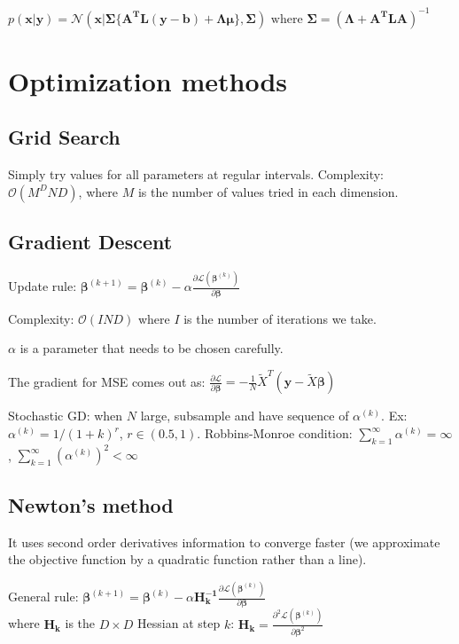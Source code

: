\documentclass[10pt,a4paper,landscape]{article}
\renewcommand{\bf}[1]{\ensuremath{\mathbf{#1}}}
\newcommand{\bbeta}{\boldsymbol\beta}
\begin{document}
\begin{multicols*}{4}
$p(\bf{x}|\bf{y}) = \mathcal{N}(\bf{x} |\boldsymbol\Sigma \{ \bf{A^T L(y - b) + \Lambda \mu} \}, \boldsymbol\Sigma)
\text{ where } \boldsymbol\Sigma = (\boldsymbol\Lambda + \bf{A^T L A})^{-1}
$

\section{Optimization methods}

\subsection{Grid Search}
Simply try values for all parameters at regular intervals.
Complexity: $\mathcal{O}(M^D N D)$, where $M$ is the number of values tried in each dimension.

\subsection{Gradient Descent}
Update rule: $\bbeta^{(k+1)} = \bbeta^{(k)} - \alpha \frac{\partial \mathcal{L}(\bbeta^{(k)})}{\partial \bbeta}$

Complexity: $\mathcal{O}(I N D)$ where $I$ is the number of iterations we take.

$\alpha$ is a parameter that needs to be chosen carefully.

The gradient for MSE comes out as:
$\frac{\partial \mathcal{L}}{\partial \bbeta} = - \frac{1}{N} \tilde{X}^T ( \boldsymbol y - \tilde{X} \bbeta )$

Stochastic GD: when $N$ large, subsample and have sequence of $\alpha^{(k)}$. Ex: $\alpha^{(k)} = 1 / (1 + k)^r$, $r \in (0.5, 1)$. Robbins-Monroe condition: $\sum_{k=1}^\infty \alpha^{(k)} = \infty$, $\sum_{k=1}^\infty (\alpha^{(k)})^2 < \infty$

\subsection{Newton's method}
It uses second order derivatives information to converge faster (we approximate the objective function by a quadratic function rather than a line).

General rule: $\bbeta^{(k+1)} = \bbeta^{(k)} - \alpha \bf{H_k^{-1}} \frac{\partial \mathcal{L}(\bbeta^{(k)})}{\partial \bbeta}$\\
where $\bf{H_k}$ is the $D \times D$ Hessian at step $k$: $\bf{H_k} = \frac{\partial^2 \mathcal{L}(\bbeta^{(k)})}{\partial \bbeta^2}$


\end{multicols*}
\end{document}
